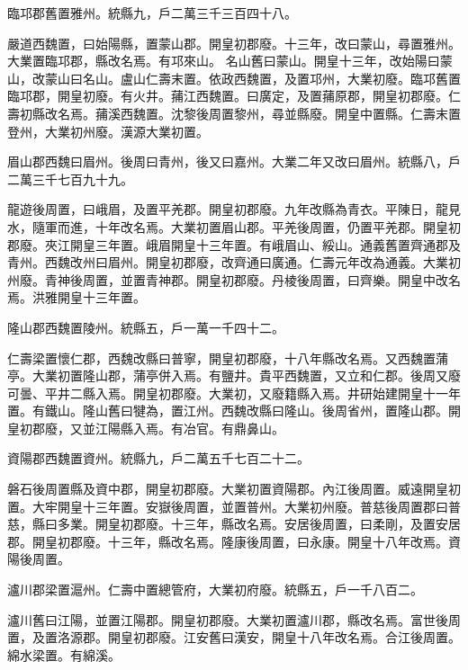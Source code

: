 \begin{pinyinscope}
 臨邛郡舊置雅州。統縣九，戶二萬三千三百四十八。



 嚴道西魏置，曰始陽縣，置蒙山郡。開皇初郡廢。十三年，改曰蒙山，尋置雅州。大業置臨邛郡，縣改名焉。有邛來山。
 名山舊曰蒙山。開皇十三年，改始陽曰蒙山，改蒙山曰名山。盧山仁壽末置。依政西魏置，及置邛州，大業初廢。臨邛舊置臨邛郡，開皇初廢。有火井。蒱江西魏置。曰廣定，及置蒱原郡，開皇初郡廢。仁壽初縣改名焉。蒱溪西魏置。沈黎後周置黎州，尋並縣廢。開皇中置縣。仁壽末置登州，大業初州廢。漢源大業初置。



 眉山郡西魏曰眉州。後周曰青州，後又曰嘉州。大業二年又改曰眉州。統縣八，戶二萬三千七百九十九。



 龍遊後周置，曰峨眉，及置平羌郡。開皇初郡廢。九年改縣為青衣。平陳日，龍見水，隨軍而進，十年改名焉。大業初置眉山郡。平羌後周置，仍置平羌郡。開皇初郡廢。夾江開皇三年置。峨眉開皇十三年置。有峨眉山、綏山。通義舊置齊通郡及青州。西魏改州曰眉州。開皇初郡廢，改齊通曰廣通。仁壽元年改為通義。大業初州廢。青神後周置，並置青神郡。開皇初郡廢。丹棱後周置，曰齊樂。開皇中改名焉。洪雅開皇十三年置。



 隆山郡西魏置陵州。統縣五，戶一萬一千四十二。



 仁壽梁置懷仁郡，西魏改縣曰普寧，開皇初郡廢，十八年縣改名焉。又西魏置蒲亭。大業初置隆山郡，蒲亭併入焉。有鹽井。貴平西魏置，又立和仁郡。後周又廢可曇、平井二縣入焉。開皇初郡廢。大業初，又廢籍縣入焉。井研始建開皇十一年置。有鐵山。隆山舊曰犍為，置江州。西魏改縣曰隆山。後周省州，置隆山郡。開皇初郡廢，又並江陽縣入焉。有冶官。有鼎鼻山。



 資陽郡西魏置資州。統縣九，戶二萬五千七百二十二。



 磐石後周置縣及資中郡，開皇初郡廢。大業初置資陽郡。內江後周置。威遠開皇初置。大牢開皇十三年置。安嶽後周置，並置普州。大業初州廢。普慈後周置郡曰普慈，縣曰多業。開皇初郡廢。十三年，縣改名焉。安居後周置，曰柔剛，及置安居郡。開皇初郡廢。十三年，縣改名焉。隆康後周置，曰永康。開皇十八年改焉。資陽後周置。



 瀘川郡梁置滬州。仁壽中置總管府，大業初府廢。統縣五，戶一千八百二。



 瀘川舊曰江陽，並置江陽郡。開皇初郡廢。大業初置瀘川郡，縣改名焉。富世後周置，及置洛源郡。開皇初郡廢。江安舊曰漢安，開皇十八年改名焉。合江後周置。綿水梁置。有綿溪。




\end{pinyinscope}
